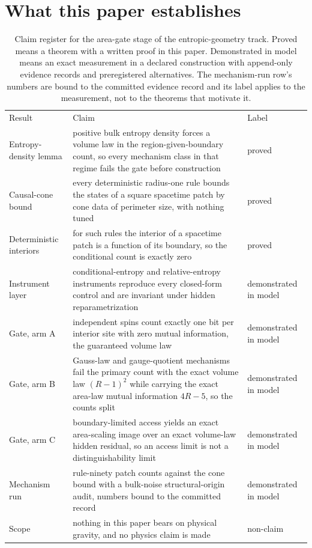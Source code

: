\documentclass[aps,pre,reprint,nofootinbib]{revtex4-2}
\begin{document}
\section{What this paper establishes}
\label{sec:claims}

\begin{table}[t]
\caption{Claim register for the area-gate stage of the entropic-geometry
track.  Proved means a theorem with a written proof in this paper.
Demonstrated in model means an exact measurement in a declared
construction with append-only evidence records and preregistered
alternatives.  The mechanism-run row's numbers are bound to the committed evidence record and its label applies to the measurement, not to the theorems that motivate it.}
\label{tab:claims}
\begin{ruledtabular}
\begin{tabular}{L{4.6cm} L{9.2cm} l}
Result & Claim & Label \\
\colrule
Entropy-density lemma & positive bulk entropy density forces a volume
law in the region-given-boundary count, so every mechanism class in that
regime fails the gate before construction & proved \\
Causal-cone bound & every deterministic radius-one rule bounds the
states of a square spacetime patch by cone data of perimeter size, with
nothing tuned & proved \\
Deterministic interiors & for such rules the interior of a spacetime
patch is a function of its boundary, so the conditional count is exactly
zero & proved \\
Instrument layer & conditional-entropy and relative-entropy instruments
reproduce every closed-form control and are invariant under hidden
reparametrization & demonstrated in model \\
Gate, arm A & independent spins count exactly one bit per interior site
with zero mutual information, the guaranteed volume law &
demonstrated in model \\
Gate, arm B & Gauss-law and gauge-quotient mechanisms fail the primary
count with the exact volume law $(R-1)^2$ while carrying the exact
area-law mutual information $4R-5$, so the counts split &
demonstrated in model \\
Gate, arm C & boundary-limited access yields an exact area-scaling image
over an exact volume-law hidden residual, so an access limit is not a
distinguishability limit & demonstrated in model \\
Mechanism run & rule-ninety patch counts against the cone bound with a
bulk-noise structural-origin audit, numbers bound to the committed
record & demonstrated in model \\
Scope & nothing in this paper bears on physical gravity, and no
physics claim is made & non-claim \\
\end{tabular}
\end{ruledtabular}
\end{table}
\end{document}

